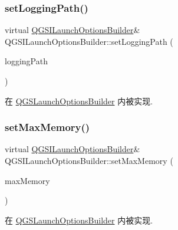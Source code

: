 \subsubsection{\texorpdfstring{set\+Logging\+Path()}{setLoggingPath()}}
{\footnotesize\ttfamily virtual \mbox{\hyperlink{class_q_g_s_i_launch_options_builder}{Q\+G\+S\+I\+Launch\+Options\+Builder}}\& Q\+G\+S\+I\+Launch\+Options\+Builder\+::set\+Logging\+Path (\begin{DoxyParamCaption}\item[{const Q\+String \&}]{logging\+Path }\end{DoxyParamCaption})\hspace{0.3cm}{\ttfamily [pure virtual]}}



在 \mbox{\hyperlink{class_q_g_s_launch_options_builder_a5f491bfbe78823ea398af943107cd9f1}{Q\+G\+S\+Launch\+Options\+Builder}} 内被实现.

\mbox{\label{class_q_g_s_i_launch_options_builder_a58390571b351c5bc06ba9f2fad8079bc}} 
\subsubsection{\texorpdfstring{set\+Max\+Memory()}{setMaxMemory()}}
{\footnotesize\ttfamily virtual \mbox{\hyperlink{class_q_g_s_i_launch_options_builder}{Q\+G\+S\+I\+Launch\+Options\+Builder}}\& Q\+G\+S\+I\+Launch\+Options\+Builder\+::set\+Max\+Memory (\begin{DoxyParamCaption}\item[{const int}]{max\+Memory }\end{DoxyParamCaption})\hspace{0.3cm}{\ttfamily [pure virtual]}}



在 \mbox{\hyperlink{class_q_g_s_launch_options_builder_adc04a84e5ad29c2a815577a28d3a3479}{Q\+G\+S\+Launch\+Options\+Builder}} 内被实现.

\mbox{\label{class_q_g_s_i_launch_options_builder_ad3e1730239e588aa35bfa6d7f0a761bd}} 
